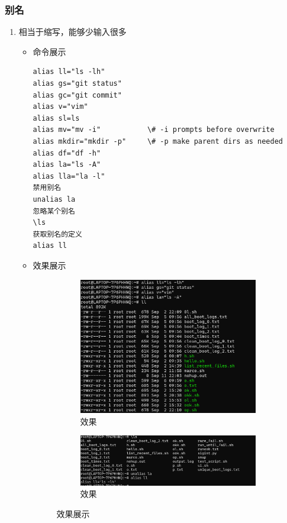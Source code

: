 \documentclass[UTF8]{ctexart}
\begin{document}
\subsubsection{别名}

\begin{enumerate}
  \item 相当于缩写，能够少输入很多
  \begin{itemize}
  \item 命令展示
  \begin{verbatim}
alias ll="ls -lh"
alias gs="git status"
alias gc="git commit"
alias v="vim"
alias sl=ls
alias mv="mv -i"           \# -i prompts before overwrite
alias mkdir="mkdir -p"     \# -p make parent dirs as needed
alias df="df -h"   
alias la="ls -A"
alias lla="la -l"
禁用别名
unalias la
忽略某个别名
\ls
获取别名的定义
alias ll
  \end{verbatim}
\item 效果展示
  \begin{figure}[H]
    \centering
    \begin{subfigure}[b]{0.48\textwidth}
        \includegraphics[width=\textwidth]{141} %
        \caption{效果}
        \label{fig:left}
    \end{subfigure}
    \hfill
    \begin{subfigure}[b]{0.48\textwidth}
        \includegraphics[width=\textwidth]{142} %
        \caption{效果}
        \label{fig:right}
    \end{subfigure}
    \caption{效果展示}
    \label{fig:side_by_side}
\end{figure}
  \end{itemize}
\end{enumerate}
\end{document}

